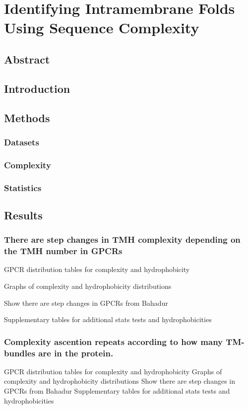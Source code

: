 
\chapter{Identifying Intramembrane Folds Using Sequence Complexity} %
\section{Abstract}
\section{Introduction}
\section{Methods}
\subsection{Datasets}
\subsection{Complexity}
\subsection{Statistics}

\section{Results}
\subsection{There are step changes in TMH complexity depending on the TMH number in GPCRs}
GPCR distribution tables for complexity and hydrophobicity

Graphs of complexity and hydrophobicity distributions

Show there are step changes in GPCRs from Bahadur

Supplementary tables for additional stats tests and hydrophobicities

\subsection{Complexity ascention repeats according to how many TM-bundles are in the protein.}
GPCR distribution tables for complexity and hydrophobicity
Graphs of complexity and hydrophobicity distributions
Show there are step changes in GPCRs from Bahadur
Supplementary tables for additional stats tests and hydrophobicities


